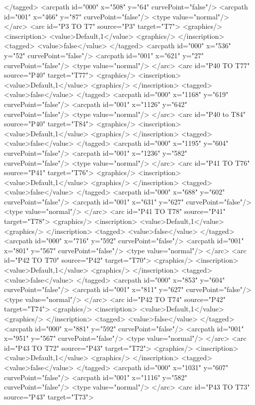 </tagged>
<arcpath id="000" x="508" y="64" curvePoint="false"/>
<arcpath id="001" x="466" y="87" curvePoint="false"/>
<type value="normal"/>
</arc>
<arc id="P3 TO T7" source="P3" target="T7">
<graphics/>
<inscription>
<value>Default,1</value>
<graphics/>
</inscription>
<tagged>
<value>false</value>
</tagged>
<arcpath id="000" x="536" y="52" curvePoint="false"/>
<arcpath id="001" x="621" y="27" curvePoint="false"/>
<type value="normal"/>
</arc>
<arc id="P40 TO T77" source="P40" target="T77">
<graphics/>
<inscription>
<value>Default,1</value>
<graphics/>
</inscription>
<tagged>
<value>false</value>
</tagged>
<arcpath id="000" x="1168" y="619" curvePoint="false"/>
<arcpath id="001" x="1126" y="642" curvePoint="false"/>
<type value="normal"/>
</arc>
<arc id="P40 to T84" source="P40" target="T84">
<graphics/>
<inscription>
<value>Default,1</value>
<graphics/>
</inscription>
<tagged>
<value>false</value>
</tagged>
<arcpath id="000" x="1195" y="604" curvePoint="false"/>
<arcpath id="001" x="1236" y="582" curvePoint="false"/>
<type value="normal"/>
</arc>
<arc id="P41 TO T76" source="P41" target="T76">
<graphics/>
<inscription>
<value>Default,1</value>
<graphics/>
</inscription>
<tagged>
<value>false</value>
</tagged>
<arcpath id="000" x="688" y="602" curvePoint="false"/>
<arcpath id="001" x="631" y="627" curvePoint="false"/>
<type value="normal"/>
</arc>
<arc id="P41 TO T78" source="P41" target="T78">
<graphics/>
<inscription>
<value>Default,1</value>
<graphics/>
</inscription>
<tagged>
<value>false</value>
</tagged>
<arcpath id="000" x="716" y="592" curvePoint="false"/>
<arcpath id="001" x="801" y="567" curvePoint="false"/>
<type value="normal"/>
</arc>
<arc id="P42 TO T70" source="P42" target="T70">
<graphics/>
<inscription>
<value>Default,1</value>
<graphics/>
</inscription>
<tagged>
<value>false</value>
</tagged>
<arcpath id="000" x="853" y="604" curvePoint="false"/>
<arcpath id="001" x="811" y="627" curvePoint="false"/>
<type value="normal"/>
</arc>
<arc id="P42 TO T74" source="P42" target="T74">
<graphics/>
<inscription>
<value>Default,1</value>
<graphics/>
</inscription>
<tagged>
<value>false</value>
</tagged>
<arcpath id="000" x="881" y="592" curvePoint="false"/>
<arcpath id="001" x="951" y="567" curvePoint="false"/>
<type value="normal"/>
</arc>
<arc id="P43 TO T72" source="P43" target="T72">
<graphics/>
<inscription>
<value>Default,1</value>
<graphics/>
</inscription>
<tagged>
<value>false</value>
</tagged>
<arcpath id="000" x="1031" y="607" curvePoint="false"/>
<arcpath id="001" x="1116" y="582" curvePoint="false"/>
<type value="normal"/>
</arc>
<arc id="P43 TO T73" source="P43" target="T73">
